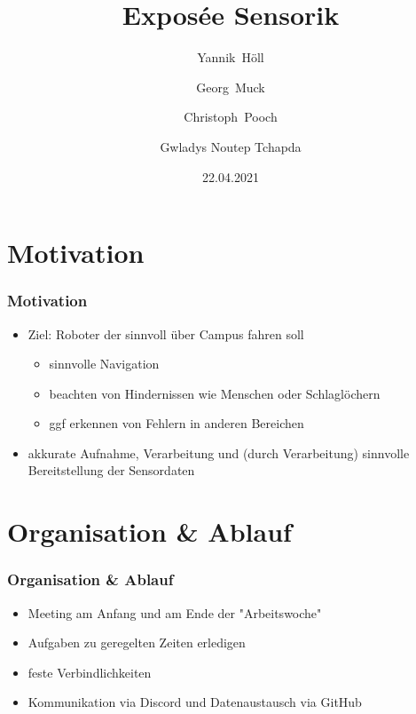 \documentclass{beamer}
\title{Exposée Sensorik}
\author[Y. Höll, G. Muck, C. Pooch, G. N. Tchapda]
	{Yannik~Höll \\ \and Georg~Muck \\ \and Christoph~Pooch \\ \and  Gwladys Noutep Tchapda}
\date{22.04.2021}
\begin{document}
	\frame{\titlepage}


\section{Motivation}
\begin{frame}
\frametitle{Motivation}
\begin{itemize}
\item<1-> Ziel: Roboter der sinnvoll über Campus fahren soll
\begin{itemize}
\item<2-4> sinnvolle Navigation
\item<3-4> beachten von Hindernissen wie Menschen oder Schlaglöchern
\item<4> ggf erkennen von Fehlern in anderen Bereichen
\end{itemize}

\item<5-> akkurate \alert<6->{Aufnahme}, \alert<6->{Verarbeitung} und (durch \alert<6->{Verarbeitung}) sinnvolle \alert<6->{Bereitstellung} der Sensordaten
\end{itemize}
\end{frame}


\section{Organisation \& Ablauf}
\begin{frame}
\frametitle{Organisation \& Ablauf}
\begin{itemize}
\item<1-> \alert{Meeting} am Anfang und am Ende der "Arbeitswoche"
\item<2-> Aufgaben zu geregelten Zeiten erledigen
\item<3-> feste \alert{Verbindlichkeiten}
\item<4-> Kommunikation via \alert{Discord} und Datenaustausch via \alert{GitHub}
\end{itemize}
\end{frame}
\end{document}
